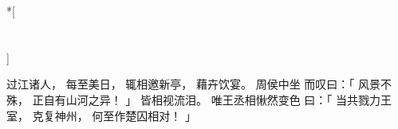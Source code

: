 
\switchcolumn[0]*[\section{}]

过江诸人，
每至美日，
辄相邀新亭，
藉卉饮宴。
周侯中坐
而叹曰：「
    风景不殊，
    正自有山河之异！
」
皆相视流泪。
唯王丞相愀然变色
曰：「
    当共戮力王室，
    克复神州，
    何至作楚囚相对！
」

\switchcolumn




